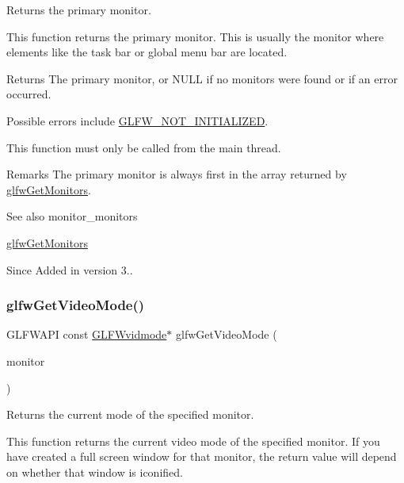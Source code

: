 Returns the primary monitor. 

This function returns the primary monitor. This is usually the monitor where elements like the task bar or global menu bar are located.

\begin{DoxyReturn}{Returns}
The primary monitor, or {\ttfamily N\+U\+LL} if no monitors were found or if an error occurred.
\end{DoxyReturn}
Possible errors include \hyperlink{group__errors_ga2374ee02c177f12e1fa76ff3ed15e14a}{G\+L\+F\+W\+\_\+\+N\+O\+T\+\_\+\+I\+N\+I\+T\+I\+A\+L\+I\+Z\+ED}.

This function must only be called from the main thread.

\begin{DoxyRemark}{Remarks}
The primary monitor is always first in the array returned by \hyperlink{group__monitor_gab4d483284c57e28837bc2cd9639e9665}{glfw\+Get\+Monitors}.
\end{DoxyRemark}
\begin{DoxySeeAlso}{See also}
monitor\+\_\+monitors 

\hyperlink{group__monitor_gab4d483284c57e28837bc2cd9639e9665}{glfw\+Get\+Monitors}
\end{DoxySeeAlso}
\begin{DoxySince}{Since}
Added in version 3.. 
\end{DoxySince}
\mbox{\label{group__monitor_gac234b63ec525c70d7e18ac84aca088c6}} 
\subsubsection{\texorpdfstring{glfw\+Get\+Video\+Mode()}{glfwGetVideoMode()}}
{\footnotesize\ttfamily G\+L\+F\+W\+A\+PI const \hyperlink{structGLFWvidmode}{G\+L\+F\+Wvidmode}$\ast$ glfw\+Get\+Video\+Mode (\begin{DoxyParamCaption}\item[{\hyperlink{group__monitor_ga8d9efd1cde9426692c73fe40437d0ae3}{G\+L\+F\+Wmonitor} $\ast$}]{monitor }\end{DoxyParamCaption})}



Returns the current mode of the specified monitor. 

This function returns the current video mode of the specified monitor. If you have created a full screen window for that monitor, the return value will depend on whether that window is iconified.


